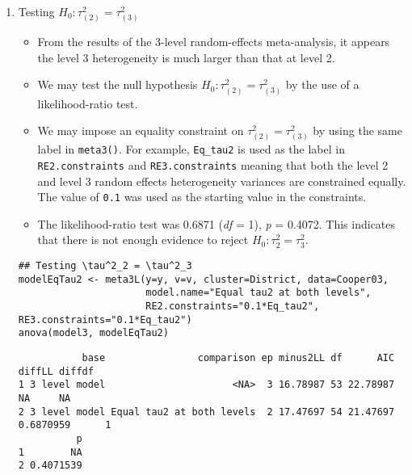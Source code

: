 \documentclass[11pt]{article}
\begin{document}
\begin{enumerate}
\item Testing \(H_0: \tau^2_{(2)} = \tau^2_{(3)}\)
\label{sec:orga4373c5}
\begin{itemize}
\item From the results of the 3-level random-effects meta-analysis, it appears the level 3 heterogeneity is much larger than that at level 2.
\item We may test the null hypothesis \(H_0: \tau^2_{(2)} = \tau^2_{(3)}\) by the use of a likelihood-ratio test.
\item We may impose an equality constraint on \(\tau^2_{(2)} = \tau^2_{(3)}\) by using the same label in \texttt{meta3()}. For example, \texttt{Eq\_tau2} is used as the label in \texttt{RE2.constraints} and \texttt{RE3.constraints} meaning that both the level 2 and level 3 random effects heterogeneity variances are constrained equally. The value of \texttt{0.1} was used as the starting value in the constraints.
\item The likelihood-ratio test was 0.6871 (\emph{df} = 1), \emph{p} = 0.4072. This indicates that there is not enough evidence to reject \(H_0: \tau^2_2=\tau^2_3\).
\end{itemize}
\begin{verbatim}
## Testing \tau^2_2 = \tau^2_3
modelEqTau2 <- meta3L(y=y, v=v, cluster=District, data=Cooper03, 
                      model.name="Equal tau2 at both levels",
                      RE2.constraints="0.1*Eq_tau2", RE3.constraints="0.1*Eq_tau2") 
anova(model3, modelEqTau2)
\end{verbatim}

\begin{verbatim}
           base                comparison ep minus2LL df      AIC    diffLL diffdf
1 3 level model                      <NA>  3 16.78987 53 22.78987        NA     NA
2 3 level model Equal tau2 at both levels  2 17.47697 54 21.47697 0.6870959      1
          p
1        NA
2 0.4071539
\end{verbatim}
\end{enumerate}
\end{document}
